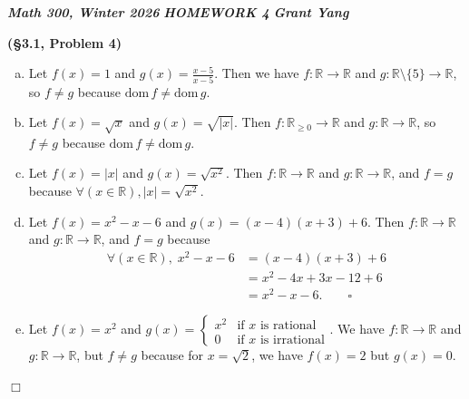 \documentclass[12pt]{article}
\theoremstyle{definition}
\newenvironment{Solution}{\noindent {\sc Solution.}}{$\Box$ \vspace{2 ex}}
\newcommand{\dom}{\mathrm{dom}}
\begin{document}
\noindent \textit{\textbf{Math 300, Winter 2026}} \hspace{1.3cm} \textit{\textbf{HOMEWORK 4}} \hspace{1.3cm} 
\textit{\textbf{Grant Yang}
} 

\vspace{0.5cm}

\begin{Solution}
{\bf (\S3.1, Problem 4)}\\
\begin{enumerate}[(a)]
    \item Let $f(x)=1$ and $g(x)=\frac{x-5}{x-5}$. Then we have $f:\mathbb{R}\to \mathbb R$ and $g : \mathbb{R} \setminus \{5\}\to \mathbb R$, so $f \ne g$ because $\dom\,f \ne \dom\,g$.
    \item Let $f(x)=\sqrt x$ and $g(x)=\sqrt{|x|}$. Then $f : \mathbb R_{\ge 0} \to \mathbb R$ and $g : \mathbb{R} \to \mathbb{R}$, so $f \ne g$ because $\dom\,f \ne \dom\,g$.
    \item Let $f(x) = |x|$ and $g(x) = \sqrt{x^2}$. Then $f : \mathbb{R} \to \mathbb{R}$ and $g : \mathbb{R} \to \mathbb{R}$, and $f = g$ because $\forall(x\in\mathbb R), |x|=\sqrt{x^2}$.
    \item Let $f(x)=x^2-x-6$ and $g(x)=(x-4)(x+3)+6$. Then $f : \mathbb{R} \to \mathbb R$ and $g : \mathbb{R} \to \mathbb{R}$, and $f = g$ because 
    \begin{align*}
        \forall (x \in \mathbb R),\; x^2-x-6&=(x-4)(x+3)+6
        \\ &= x^2 -4x+3x-12+6
        \\ &= x^2 - x - 6. \qquad\square
    \end{align*}
    \item Let $f(x)=x^2$ and $g(x)=\begin{cases}x^2 & \text{if } x \text{ is rational} \\ 0 & \text{if } x \text{ is irrational}\end{cases}$. We have $f : \mathbb{R} \to \mathbb{R}$ and $g : \mathbb{R} \to \mathbb{R}$, but $f \ne g$ because for $x=\sqrt{2}$, we have $f(x)=2$ but $g(x)=0$.
\end{enumerate}
\end{Solution}
\end{document}

